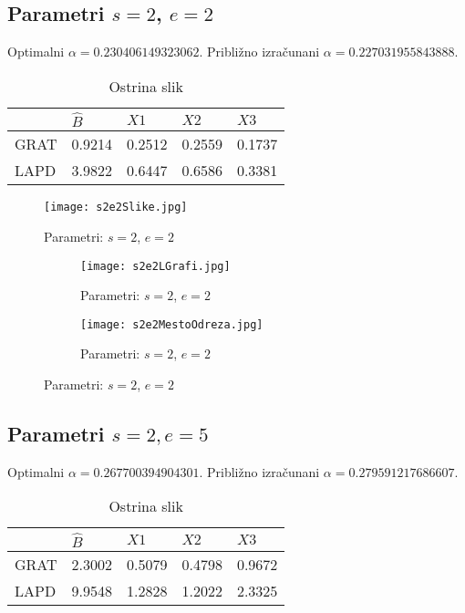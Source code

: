 \documentclass[a4paper,12pt]{article}
\begin{document}
\subsection{Parametri $s = 2$, $e = 2$}
Optimalni $\alpha = 0.230406149323062$.
Približno izračunani $\alpha = 0.227031955843888.$ 
\begin{table}[h!]
	\centering
	\caption{Ostrina slik}
	\label{my-label}
	\begin{tabular}{|l|l|l|l|l|}
		\hline
		& $\widehat{B}$ & $X1$   & $X2$   & $X3$   \\ \hline
		GRAT & 0.9214        & 0.2512 & 0.2559 & 0.1737 \\ \hline
		LAPD & 3.9822        & 0.6447 & 0.6586 & 0.3381 \\ \hline
	\end{tabular}
\end{table}


\begin{figure}[h!]
	\texttt{[image: s2e2Slike.jpg]}
	\centering
	\caption{Parametri: $s = 2$, $e = 2$}
	\label{fig:s2e2Slike}
\end{figure}
\begin{figure}[h!]
	\begin{subfigure}{.5\textwidth}
	\texttt{[image: s2e2LGrafi.jpg]}
	\centering
	\caption{Parametri: $s = 2$, $e = 2$}
	\label{fig:s2e2LGrafi}
	\end{subfigure}
	\begin{subfigure}{.5\textwidth}
	\texttt{[image: s2e2MestoOdreza.jpg]}
	\centering
	\caption{Parametri: $s = 2$, $e = 2$}
	\label{fig:s2e5LMestoOdreza}
	\end{subfigure}
\end{figure}

\newpage
\subsection{Parametri $s=2, e=5$}

Optimalni $\alpha = 0.267700394904301$.
Približno izračunani $\alpha = 0.279591217686607.$ 


\begin{table}[h!]
	\centering
\caption{Ostrina slik}
	\begin{tabular}{|l|l|l|l|l|}
		\hline
		& $\widehat{B}$ & $X1$   & $X2$   & $X3$   \\ \hline
		GRAT & 2.3002        & 0.5079 & 0.4798 & 0.9672 \\ \hline
		LAPD & 9.9548        & 1.2828 & 1.2022 & 2.3325 \\ \hline
	\end{tabular}
\end{table}
\end{document}
